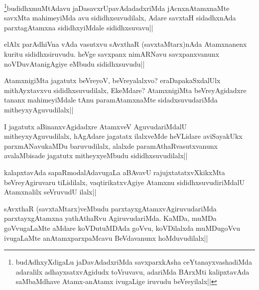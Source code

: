 
\begin{artha}
\footnote{budAdhxyXdigaLu jaDavAdadxriMda savxparxkAsha ceYtanayxvashadiMda adaralilx adhayxsatxvAgidudx toVruvavu, adariMda BArxMti kalipxtavAda saMbaMdhave Atamx-anAtamx ivugaLige iruvudu beVreyilalx||}budidhxmuMtAdavu jaDasavxrUpavAdadadxriMda jAcnxnAtamxnaMte savxMta mahimeyiMda avu sididhxsuvudilalx, Adare savxtaH sidadhxnAda parxtagAtamxna sididhxyiMdale sididhxsuvavu||
\end{artha}


\begin{artha}
elAlx parAdhiVna vAda vasutxvu sAvxthaR (savxtaMtarx)nAda Atamxnanenx kuritu sididhxsiruvudu. heVge savxpanx nimARNavu savxpanxvanunx noVDuvAtanigAgiye eMbudu sididhxsuvudu||
\end{artha}



\begin{artha}
AtamxnigiMta jagatutx beVreyoV, beVreyalalxvo? eraDapakaSxdalUlx mithAyxtavxvu sididhxsuvudilalx, EkeMdare? AtamxnigiMta beVreyAgidadxre tananx mahimeyiMdale tAnu paramAtamxnaMte sidadxsuvudariMda mitheyxyAguvudilalx||
\end{artha}


\begin{artha}
I jagatutx aBinanxvAgidadxre AtamxveV AguvudariMdalU mitheyxyAguvudilalx, hAgAdare jagatatx ilalxveMde heVLidare aviSayakUkx parxmANavukaMDu baruvudilalx, alalxde paramAthaRvasutxvanunx avalaMbisade jagatutx mitheyxyeMbudu sididhxsuvudilalx||
\end{artha}


\begin{artha}
kalapxtavAda sapaRmodalAdavugaLa aBAvavU rajujxtatatxvXkikxMta beVreyAgiruvaru tiLidilalx, vaqtirikatxvAgiye Atamxnu sididhxsuvudiriMdalU Atamxnalilx seVruvudU ilalx||
\end{artha}


\begin{artha}
sAvxthaR (savxtaMtarx)veMbudu parxtayxgAtamxvAgiruvudariMda parxtayxgAtamxna yathAthaRvu AgiruvudariMda. KaMDa, muMDa goVvugaLaMte aMdare koVDutuMDAda goVvu, koVDilalxda muMDugoVvu ivugaLaMte anAtamxparxpaMcavu BeVdavanunx hoMduvudilalx||
\end{artha}

